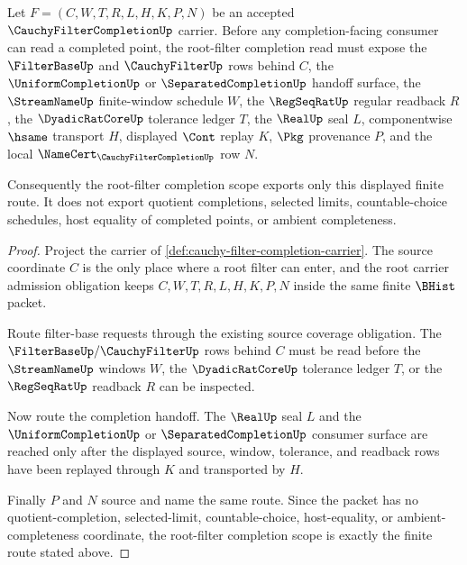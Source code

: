 \begin{theorem}
\label{thm:cauchyfiltercompletion-root-filter-scope-closure}
Let $F=(C,W,T,R,L,H,K,P,N)$ be an accepted $\CauchyFilterCompletionUp$ carrier. Before any completion-facing consumer can read a completed point, the root-filter completion read must expose the $\FilterBaseUp$ and $\CauchyFilterUp$ rows behind $C$, the $\UniformCompletionUp$ or $\SeparatedCompletionUp$ handoff surface, the $\StreamNameUp$ finite-window schedule $W$, the $\RegSeqRatUp$ regular readback $R$, the $\DyadicRatCoreUp$ tolerance ledger $T$, the $\RealUp$ seal $L$, componentwise $\hsame$ transport $H$, displayed $\Cont$ replay $K$, $\Pkg$ provenance $P$, and the local $\NameCert_{\CauchyFilterCompletionUp}$ row $N$.

Consequently the root-filter completion scope exports only this displayed finite route. It does not export quotient completions, selected limits, countable-choice schedules, host equality of completed points, or ambient completeness.
\end{theorem}
\begin{proof}
Project the carrier of \autoref{def:cauchy-filter-completion-carrier}. The source coordinate $C$ is the only place where a root filter can enter, and the root carrier admission obligation keeps $C,W,T,R,L,H,K,P,N$ inside the same finite $\BHist$ packet.

Route filter-base requests through the existing source coverage obligation. The $\FilterBaseUp/\CauchyFilterUp$ rows behind $C$ must be read before the $\StreamNameUp$ windows $W$, the $\DyadicRatCoreUp$ tolerance ledger $T$, or the $\RegSeqRatUp$ readback $R$ can be inspected.

Now route the completion handoff. The $\RealUp$ seal $L$ and the $\UniformCompletionUp$ or $\SeparatedCompletionUp$ consumer surface are reached only after the displayed source, window, tolerance, and readback rows have been replayed through $K$ and transported by $H$.

Finally $P$ and $N$ source and name the same route. Since the packet has no quotient-completion, selected-limit, countable-choice, host-equality, or ambient-completeness coordinate, the root-filter completion scope is exactly the finite route stated above.
\end{proof}

